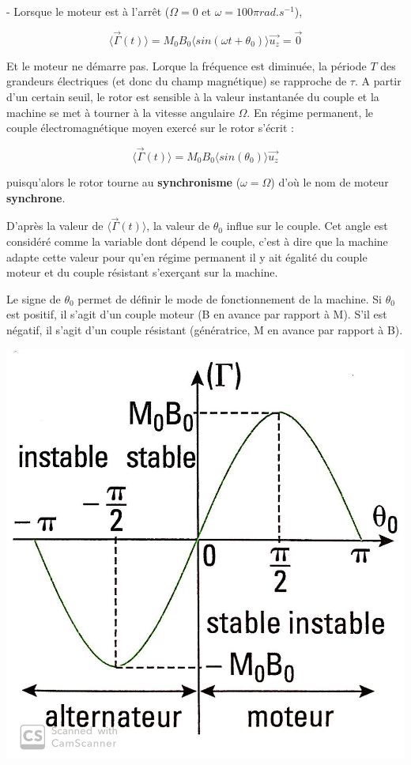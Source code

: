 \documentclass{article}
\begin{document}
- Lorsque le moteur est à l'arrêt ($\Omega = 0$ et $\omega = 100 \pi rad.s^{-1}$),

\begin{equation}
    \langle \vec{\Gamma}(t) \rangle = M_0 B_0 \langle sin( \omega t + \theta_0 ) \rangle \vec{u_z} = \vec{0}
\end{equation}

Et le moteur ne démarre pas. Lorque la fréquence est diminuée, la période $T$ des grandeurs électriques (et donc du champ magnétique) se rapproche de $\tau$. A partir d'un certain seuil, le rotor est sensible à la valeur instantanée du couple et la machine se met à tourner à la vitesse angulaire $\Omega$. En régime permanent, le couple électromagnétique moyen exercé sur le rotor s'écrit :

\begin{equation}
    \langle \vec{\Gamma}(t) \rangle = M_0 B_0 \langle sin(\theta_0 ) \rangle \vec{u_z}
\end{equation}

puisqu'alors le rotor tourne au \textbf{synchronisme} ($\omega = \Omega$) d'où le nom de moteur \textbf{synchrone}.\medskip

D'après la valeur de $\langle \vec{\Gamma}(t) \rangle$, la valeur de $\theta_0$ influe sur le couple. Cet angle est considéré comme la variable dont dépend le couple, c'est à dire que la machine adapte cette valeur pour qu'en régime permanent il y ait égalité du couple moteur et du couple résistant s'exerçant sur la machine.\medskip

Le signe de $\theta_0$ permet de définir le mode de fonctionnement de la machine. Si $\theta_0$ est positif, il s'agit d'un couple moteur (B en avance par rapport à M). S'il est négatif, il s'agit d'un couple résistant (génératrice, M en avance par rapport à B).

\begin{center}
    \includegraphics[scale=0.12]{theta0.jpg}
\end{center}
\end{document}
